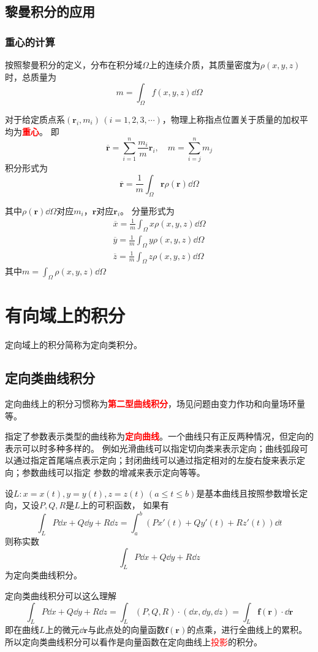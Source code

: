 \subsection{黎曼积分的应用}
\subsubsection{重心的计算}
按照黎曼积分的定义，分布在积分域$\Omega$上的连续介质，其质量密度为$\rho(x,y,z)$时，总质量为
\[ m = \int_\Omega f(x,y,z)\dd{\Omega} \]

对于给定质点系$(\bm{r}_i,m_i)\,(i=1,2,3,\cdots)$，物理上称指点位置关于质量的加权平均为\textcolor{red}{\textbf{\textsf{重心}}}。
即
\[ \overline{\bm{r}} = \sum_{i=1}^{n} \frac{m_i}{m}\bm{r}_i, \quad m = \sum_{i=j}^n m_j \]
积分形式为
\begin{equation}
    \overline{\bm{r}} = \frac{1}{m}\int_\Omega \bm{r} \rho(\bm{r})\dd{\Omega}
\end{equation}

其中$\rho(\bm{r})\dd{\Omega}$对应$m_i$，$\bm{r}$对应$\bm{r}_i$。
分量形式为
\begin{align}
    \overline{x} = \frac{1}{m}\int_\Omega x\rho(x,y,z)\dd{\Omega} \\
    \overline{y} = \frac{1}{m}\int_\Omega y\rho(x,y,z)\dd{\Omega} \\
    \overline{z} = \frac{1}{m}\int_\Omega z\rho(x,y,z)\dd{\Omega}
\end{align}
其中$\displaystyle m = \int_\Omega \rho(x,y,z)\dd{\Omega}$

\section{有向域上的积分}
定向域上的积分简称为定向类积分。
\subsection{定向类曲线积分}
定向曲线上的积分习惯称为\textcolor{red}{\textbf{\textsf{第二型曲线积分}}}，场见问题由变力作功和向量场环量等。

指定了参数表示类型的曲线称为\textcolor{red}{\textbf{\textsf{定向曲线}}}。一个曲线只有正反两种情况，但定向的表示可以时多种多样的。
例如光滑曲线可以指定切向类来表示定向；曲线弧段可以通过指定首尾端点表示定向；封闭曲线可以通过指定相对的左旋右旋来表示定向；参数曲线可以指定
参数的增减来表示定向等等。

\begin{definition}
    设$L:x=x(t),y=y(t),z=z(t)\,(a\leq t\leq b)$是基本曲线且按照参数增长定向，又设$P,Q,R$是$L$上的可积函数，
    如果有
    \[ \int_L P\dd{x} + Q\dd{y} + R\dd{z} = \int_a^b (Px'(t) + Qy'(t) + Rz'(t))\dd{t} \]
    则称实数
    \[ \int_L P\dd{x} + Q\dd{y} + R\dd{z} \]
    为定向类曲线积分。
\end{definition}
定向类曲线积分可以这么理解
\[ \int_L P\dd{x} + Q\dd{y} + R\dd{z} = \int_L (P,Q,R) \cdot (\dd{x},\dd{y},\dd{z}) = \int_L \bm{f}(\bm{r}) \cdot \dd{\bm{r}} \]
即在曲线$L$上的微元$\dd{\bm{r}}$与此点处的向量函数$\bm{f}(\bm{r})$的点乘，进行全曲线上的累积。
所以定向类曲线积分可以看作是向量函数在定向曲线上\textcolor{red}{投影}的积分。

